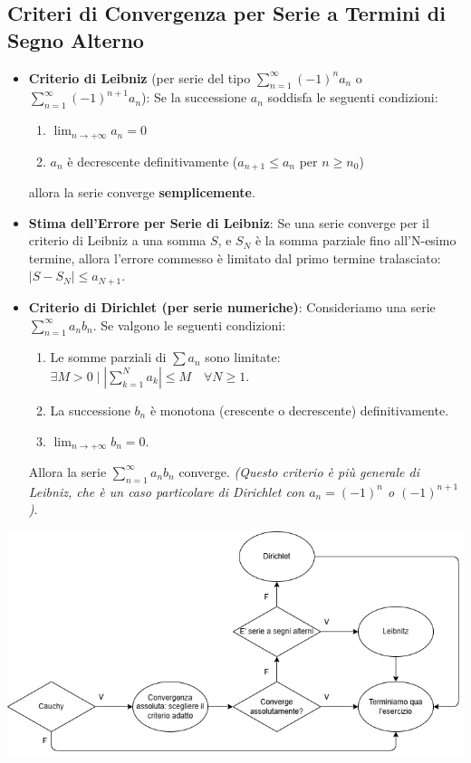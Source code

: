 \documentclass[10pt, a4paper]{article}
\begin{document}
    \subsection{Criteri di Convergenza per Serie a Termini di Segno Alterno}
        \begin{itemize}
            \item \textbf{Criterio di Leibniz} (per serie del tipo $\sum_{n=1}^{\infty}(-1)^n a_n$ o $\sum_{n=1}^{\infty}(-1)^{n+1} a_n$):
            Se la successione $a_n$ soddisfa le seguenti condizioni:
            \begin{enumerate}
                \item $\lim_{n\rightarrow+\infty}a_n=0$
                \item $a_n$ è decrescente definitivamente ($a_{n+1} \leq a_n$ per $n \geq n_0$)
            \end{enumerate}
            allora la serie converge \textbf{semplicemente}.

            \item \textbf{Stima dell'Errore per Serie di Leibniz}:
            Se una serie converge per il criterio di Leibniz a una somma $S$, e $S_N$ è la somma parziale fino all'N-esimo termine, allora l'errore commesso è limitato dal primo termine tralasciato:
            $\left|S - S_N\right| \leq a_{N+1}$.

            \item \textbf{Criterio di Dirichlet (per serie numeriche)}:
            Consideriamo una serie $\sum_{n=1}^{\infty}a_nb_n$. Se valgono le seguenti condizioni:
            \begin{enumerate}
                \item Le somme parziali di $\sum a_n$ sono limitate: $\exists M>0 \mid \left|\sum_{k=1}^{N}a_k\right|\leq M \quad \forall N\geq 1$.
                \item La successione $b_n$ è monotona (crescente o decrescente) definitivamente.
                \item $\lim_{n\rightarrow+\infty}b_n=0$.
            \end{enumerate}
            Allora la serie $\sum_{n=1}^{\infty}a_nb_n$ converge.
            \textit{(Questo criterio è più generale di Leibniz, che è un caso particolare di Dirichlet con $a_n = (-1)^n$ o $(-1)^{n+1}$)}.
        \end{itemize}

    \begin{center}
        \includegraphics[width=.8\textwidth]{Images/convergenzaflowchart.png}
    \end{center}
\end{document}
